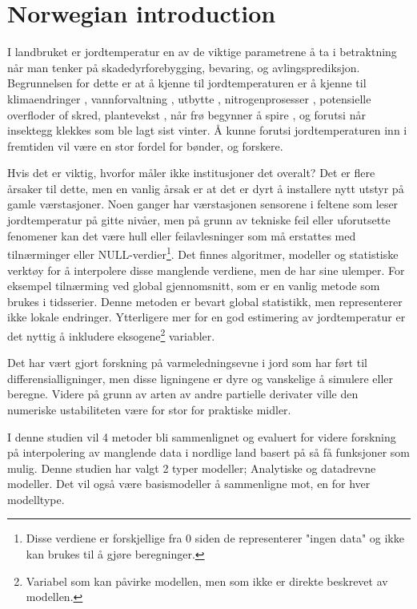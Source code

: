 \section{Norwegian introduction}

I landbruket er jordtemperatur en av de viktige parametrene å ta i betraktning når man tenker på skadedyrforebygging, bevaring, og avlingsprediksjon. Begrunnelsen for dette er at å kjenne til jordtemperaturen er å kjenne til klimaendringer \cite{li_attention-aware_2022}, vannforvaltning \cite{alizamir_advanced_2020}, utbytte \cite{sim_prediction_2020}, nitrogenprosesser \cite{rankinen_simple_2004}, potensielle overfloder of skred\cite{stuurop_influence_2022}, plantevekst \cite{li_modeling_2020}, når frø begynner å spire \cite{li_modeling_2020}, og forutsi når insektegg klekkes som ble lagt sist vinter. Å kunne forutsi jordtemperaturen inn i fremtiden vil være en stor fordel for bønder, og forskere.

Hvis det er viktig, hvorfor måler ikke institusjoner det overalt? Det er flere årsaker til dette, men en vanlig årsak er at det er dyrt å installere nytt utstyr på gamle værstasjoner. Noen ganger har værstasjonen sensorene i feltene som leser jordtemperatur på gitte nivåer, men på grunn av tekniske feil eller uforutsette fenomener kan det være hull eller feilavlesninger som må erstattes med tilnærminger eller NULL-verdier\footnote{Disse verdiene er forskjellige fra 0 siden de representerer "ingen data" og ikke kan brukes til å gjøre beregninger.}. Det finnes algoritmer, modeller og statistiske verktøy for å interpolere disse manglende verdiene, men de har sine ulemper. For eksempel tilnærming ved global gjennomsnitt, som er en vanlig metode som brukes i tidsserier\cite{lepot_interpolation_2017}. Denne metoden er bevart global statistikk, men representerer ikke lokale endringer. Ytterligere mer for en god estimering av jordtemperatur er det nyttig å inkludere eksogene\footnote{Variabel som kan påvirke modellen, men som ikke er direkte beskrevet av modellen.} variabler.

Det har vært gjort forskning på varmeledningsevne i jord som har ført til differensialligninger\cite{karvonen_model_1988}, men disse ligningene\cite{fourier_analytical_2009,karvonen_model_1988} er dyre og vanskelige å simulere eller beregne\cite{rankinen_simple_2004}. Videre på grunn av arten av andre partielle derivater ville den numeriske ustabiliteten være for stor for praktiske midler.

I denne studien vil 4 metoder bli sammenlignet og evaluert for videre forskning på interpolering av manglende data i nordlige land basert på så få funksjoner som mulig. Denne studien har valgt 2 typer modeller; Analytiske og datadrevne modeller. Det vil også være basismodeller å sammenligne mot, en for hver modelltype.